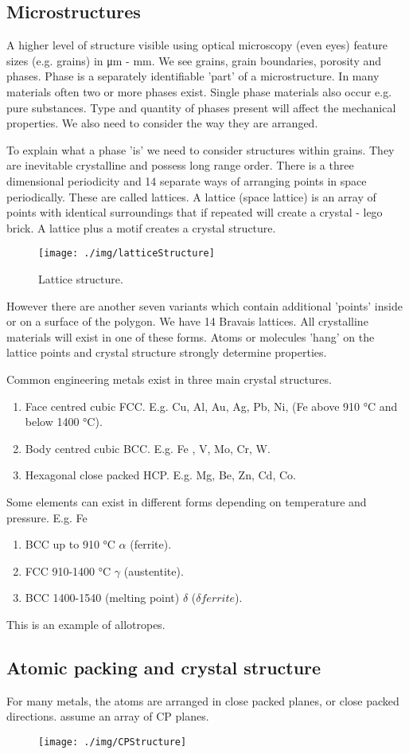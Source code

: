\subsection{Microstructures}
A higher level of structure visible using optical microscopy (even eyes) feature sizes (e.g. grains) in \si{\micro\meter} - \si{\milli\meter}. We see grains, grain boundaries, porosity and phases. Phase is a separately identifiable 'part' of a microstructure. In many materials often two or more phases exist. Single phase materials also occur e.g. pure substances. Type and quantity of phases present will affect the mechanical properties. We also need to consider the way they are arranged.

To explain what a phase 'is' we need to consider structures within grains. They are inevitable crystalline and possess long range order. There is a three dimensional periodicity and 14 separate ways of arranging points in space periodically. These are called lattices. A lattice (space lattice) is an array of points with identical surroundings that if repeated will create a crystal - lego brick. A lattice plus a motif creates a crystal structure.
\begin{figure}
  \centering
  \texttt{[image: ./img/latticeStructure]}
  \caption{Lattice structure.}
\end{figure}
However there are another seven variants which contain additional 'points' inside or on a surface of the polygon. We have 14 Bravais lattices. All crystalline materials will exist in one of these forms. Atoms or molecules 'hang' on the lattice points and crystal structure strongly determine properties.

Common engineering metals exist in three main crystal structures.
\begin{enumerate}[noitemsep]
  \item Face centred cubic FCC. E.g. Cu, Al, Au, Ag, Pb, Ni, (Fe above 910 \si{\celsius} and below 1400 \si{\celsius}).
  \item Body centred cubic BCC. E.g. Fe , V, Mo, Cr, W.
  \item Hexagonal close packed HCP. E.g. Mg, Be, Zn, Cd, Co.
\end{enumerate}
Some elements can exist in different forms depending on temperature and pressure. E.g. Fe
\begin{enumerate}
  \item BCC up to 910 \si{\celsius} $\alpha$ (ferrite).
  \item FCC 910-1400 \si{\celsius} $\gamma$ (austentite).
  \item BCC 1400-1540 (melting point) $\delta$ ($\delta ferrite$).
\end{enumerate}
This is an example of allotropes.
\subsection{Atomic packing and crystal structure}
For many metals, the atoms are arranged in close packed planes, or close packed directions. assume an array of CP planes.
\begin{figure}
  \centering
  \texttt{[image: ./img/CPStructure]}
\end{figure}